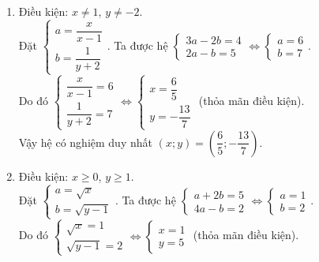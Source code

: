 \begin{bt}
{\begin{enumerate}
			Do đó $\begin{cases} x+y = 1\\ \sqrt{x+1} = 2\end{cases} \Leftrightarrow \begin{cases} x = 3\\ y = -2\end{cases}$ (thỏa mãn điều kiện).\\
			Vậy hệ có nghiệm duy nhất $\left(x;y\right) = \left(3;-2\right)$.
			\item 
			Điều kiện: $x \ne 1$, $y \ne -2$.\\
			Đặt $\begin{cases} a = \dfrac{x}{x-1}\\ b = \dfrac{1}{y+2}\end{cases}$. 
			Ta được hệ $\begin{cases} 3a -2b = 4\\ 2a - b = 5\end{cases} \Leftrightarrow \begin{cases} a = 6\\ b = 7\end{cases}$. \\
			Do đó $\begin{cases} \dfrac{x}{x-1} = 6\\ \dfrac{1}{y +2} = 7\end{cases} \Leftrightarrow \begin{cases} x = \dfrac{6}{5}\\ y = -\dfrac{13}{7}\end{cases}$ (thỏa mãn điều kiện).\\
			Vậy hệ có nghiệm duy nhất $\left(x;y\right) = \left(\dfrac{6}{5};-\dfrac{13}{7} \right)$.
			\item 
			Điều kiện: $x \ge 0$, $y \ge 1$.\\
			Đặt $\begin{cases} a = \sqrt{x}\\ b = \sqrt{y-1}\end{cases}$. 
			Ta được hệ $\begin{cases} a + 2b = 5\\ 4a - b = 2\end{cases} \Leftrightarrow \begin{cases} a = 1\\ b = 2\end{cases}$. \\
			Do đó $\begin{cases} \sqrt{x} = 1\\ \sqrt{y-1} = 2\end{cases} \Leftrightarrow \begin{cases} x = 1\\ y = 5\end{cases}$ (thỏa mãn điều kiện).\\

\end{enumerate}}
\end{bt}
